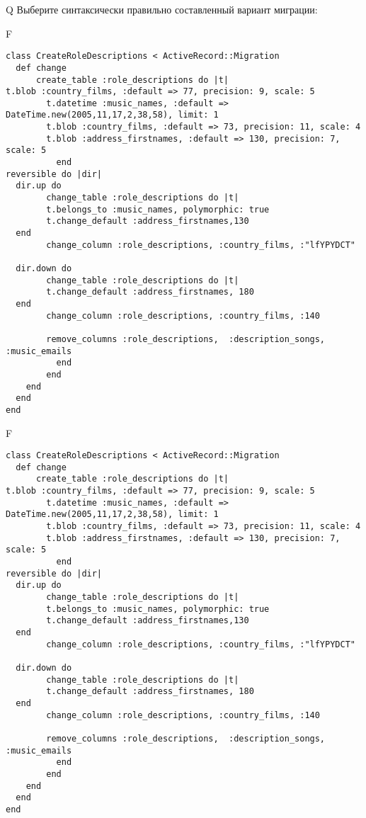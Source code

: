Q
Выберите синтаксически правильно составленный вариант миграции:

F
\begin{verbatim}
class CreateRoleDescriptions < ActiveRecord::Migration
  def change
	  create_table :role_descriptions do |t|
t.blob :country_films, :default => 77, precision: 9, scale: 5
		t.datetime :music_names, :default => DateTime.new(2005,11,17,2,38,58), limit: 1
		t.blob :country_films, :default => 73, precision: 11, scale: 4
		t.blob :address_firstnames, :default => 130, precision: 7, scale: 5
		  end
reversible do |dir|
  dir.up do
		change_table :role_descriptions do |t|
		t.belongs_to :music_names, polymorphic: true
 		t.change_default :address_firstnames,130
  end
 		change_column :role_descriptions, :country_films, :"lfYPYDCT"
   
  dir.down do
		change_table :role_descriptions do |t|
		t.change_default :address_firstnames, 180
  end
 		change_column :role_descriptions, :country_films, :140
   
		remove_columns :role_descriptions,  :description_songs, :music_emails 
	      end
	    end
    end 
  end
end

\end{verbatim}

F
\begin{verbatim}
class CreateRoleDescriptions < ActiveRecord::Migration
  def change
	  create_table :role_descriptions do |t|
t.blob :country_films, :default => 77, precision: 9, scale: 5
		t.datetime :music_names, :default => DateTime.new(2005,11,17,2,38,58), limit: 1
		t.blob :country_films, :default => 73, precision: 11, scale: 4
		t.blob :address_firstnames, :default => 130, precision: 7, scale: 5
		  end
reversible do |dir|
  dir.up do
		change_table :role_descriptions do |t|
		t.belongs_to :music_names, polymorphic: true
 		t.change_default :address_firstnames,130
  end
 		change_column :role_descriptions, :country_films, :"lfYPYDCT"
   
  dir.down do
		change_table :role_descriptions do |t|
		t.change_default :address_firstnames, 180
  end
 		change_column :role_descriptions, :country_films, :140
   
		remove_columns :role_descriptions,  :description_songs, :music_emails 
	      end
	    end
    end 
  end
end

\end{verbatim}

